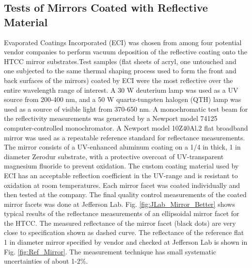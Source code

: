 \subsection{Tests of Mirrors Coated with Reflective Material}
Evaporated Coatings Incorporated (ECI) was chosen from among four potential vendor companies to perform vacuum deposition of the reflective coating onto the HTCC mirror substrates.Test samples (flat sheets of acryl, one untouched and one subjected to the same thermal shaping process used to form the front and back surfaces of the mirrors) coated by ECI were the most reflective over the entire wavelength range of interest. A 30 W deuterium lamp was used as a UV source from 200-400 nm, and a 50 W quartz-tungsten halogen (QTH) lamp was used as a source of visible light from 370-650 nm. A monochromatic test beam for the reflectivity measurements was generated by a Newport model 74125 computer-controlled monochromator. A Newport model 10Z40Al.2 flat broadband mirror was used as a repeatable reference standard for reflectance measurements. The mirror consists of a UV-enhanced aluminum coating on a 1/4 in thick, 1 in diameter Zerodur substrate, with a protective overcoat of UV-transparent magnesium fluoride to prevent oxidation.
The custom coating material used by ECI has an acceptable reflection coefficient in the UV-range and is resistant to oxidation at room temperatures. Each mirror facet was coated individually and then tested at the company. The final quality control measurements of the coated mirror facets was done at Jefferson Lab. Fig. \ref{fig:JLab_Mirror_Better}  shows typical results of the reflectance  measurements of an ellipsoidal mirror facet for the HTCC. The measured reflectance of the mirror facet (black dots) are very close to specification shown as dashed curve. The reflectance of the reference flat 1 in diameter mirror specified by vendor and checked at Jefferson Lab is shown in Fig. \ref{fig:Ref_Mirror}. The measurement technique has small systematic uncertainties of about 1-2\%.


